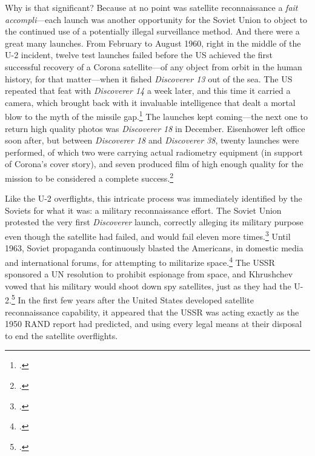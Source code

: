 \documentclass{report}
\begin{document}
Why is that significant? Because at no point was satellite reconnaissance a \emph{fait accompli}---each launch was another opportunity for the Soviet Union to object to the continued use of a potentially illegal surveillance method. And there were a great many launches. From February to August 1960, right in the middle of the U-2 incident, twelve test launches failed before the US achieved the first successful recovery of a Corona satellite---of any object from orbit in the human history, for that matter---when it fished \emph{Discoverer 13} out of the sea. The US repeated that feat with \emph{Discoverer 14} a week later, and this time it carried a camera, which brought back with it invaluable intelligence that dealt a mortal blow to the myth of the missile gap.\footcite[p.~101-102. The previous failures had been so demoralizing that \emph{Discoverer 13} only carried diagnostic equipment, which made its success all the more exciting. Ships on standby were able to retrieve the satellite even though it fell outside the recovery zone---\emph{Discoverer 13} many not have landed in the ballpark or the outfield, but in many respects, the mission was a home run.]{lindgren_trust_2000} The launches kept coming---the next one to return high quality photos was \emph{Discoverer 18} in December. Eisenhower left office soon after, but between \emph{Discoverer 18} and \emph{Discoverer 38}, twenty launches were performed, of which two were carrying actual radiometry equipment (in support of Corona's cover story), and seven produced film of high enough quality for the mission to be considered a complete success.\footcite[p.~103]{lindgren_trust_2000}

Like the U-2 overflights, this intricate process was immediately identified by the Soviets for what it was: a military reconnaissance effort. The Soviet Union protested the very first \emph{Discoverer} launch, correctly alleging its military purpose even though the satellite had failed, and would fail eleven more times.\footcite[p.~140]{day_eye_2015} Until 1963, Soviet propaganda continuously blasted the Americans, in domestic media and international forums, for attempting to militarize space.\footcite[p.~271]{mcdougall_heavens_1985} The USSR sponsored a UN resolution to prohibit espionage from space, and Khrushchev vowed that his military would shoot down spy satellites, just as they had the U-2.\footcite[p.~166]{day_eye_2015} In the first few years after the United States developed satellite reconnaissance capability, it appeared that the USSR was acting exactly as the 1950 RAND report had predicted, and using every legal means at their disposal to end the satellite overflights.
\end{document}
